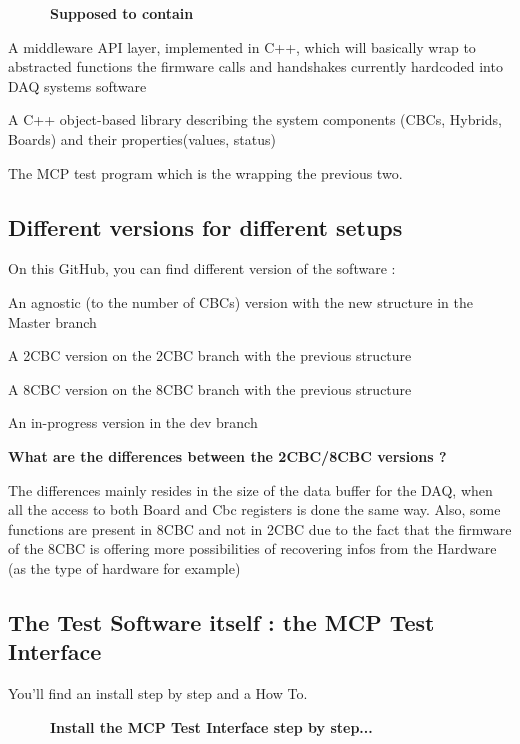 ~~~~~~{\bfseries Supposed to contain}


\begin{DoxyItemize}
\item A middleware A\-P\-I layer, implemented in C++, which will basically wrap to abstracted functions the firmware calls and handshakes currently hardcoded into D\-A\-Q systems software
\item A C++ object-\/based library describing the system components (C\-B\-Cs, Hybrids, Boards) and their properties(values, status)
\item The M\-C\-P test program which is the wrapping the previous two.
\end{DoxyItemize}

\subsection*{Different versions for different setups }

On this Git\-Hub, you can find different version of the software \-:
\begin{DoxyItemize}
\item An agnostic (to the number of C\-B\-Cs) version with the new structure in the Master branch
\item A 2\-C\-B\-C version on the 2\-C\-B\-C branch with the previous structure
\item A 8\-C\-B\-C version on the 8\-C\-B\-C branch with the previous structure
\item An in-\/progress version in the dev branch \par
 \par
 {\bfseries What are the differences between the 2\-C\-B\-C/8\-C\-B\-C versions ?}
\end{DoxyItemize}

The differences mainly resides in the size of the data buffer for the D\-A\-Q, when all the access to both Board and Cbc registers is done the same way. Also, some functions are present in 8\-C\-B\-C and not in 2\-C\-B\-C due to the fact that the firmware of the 8\-C\-B\-C is offering more possibilities of recovering infos from the Hardware (as the type of hardware for example)

\subsection*{The Test Software itself \-: the M\-C\-P Test Interface }

You'll find an install step by step and a How To. \par
 \par
 ~~~~~~{\bfseries Install the M\-C\-P Test Interface step by step...}

